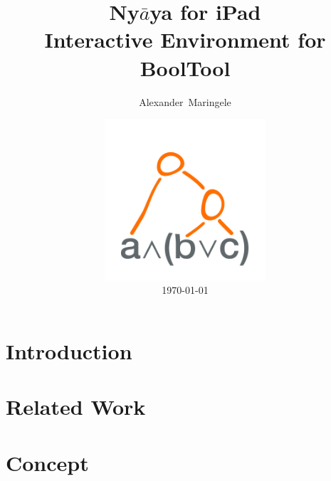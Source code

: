 \documentclass{clbthesis}
\begin{document}

\title{Ny$\bar{a}$ya for iPad\vspace{0.5cm}\\ \LARGE{Interactive Environment for BoolTool}}
\author{Alexander~Maringele}
\date{\includegraphics[width=6cm]{pics/NyayaAppIcon1024.png}\\ \today}


\maketitle

\abstract{}

\tableofcontents
\chapter{Introduction} 			


\chapter{Related Work}						


\chapter{Concept}							

\end{document}
